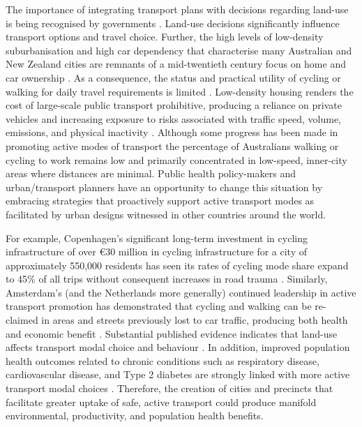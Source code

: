 \documentclass[final,3p,times,authoryear]{elsarticle}
\begin{document}
The importance of integrating transport plans with decisions regarding land-use is being recognised by governments \citep{ATAP2016,SA2015}. Land-use decisions significantly influence transport options and travel choice. Further, the high levels of low-density suburbanisation and high car dependency that characterise many Australian and New Zealand cities are remnants of a mid-twentieth century focus on home and car ownership \citep{Currie2007,Dodson2008}. As a consequence, the status and practical utility of cycling or walking for daily travel requirements is limited \citep{Heesch2014,Daley2011}. Low-density housing renders the cost of large-scale public transport prohibitive, producing a reliance on private vehicles and increasing exposure to risks associated with traffic speed, volume, emissions, and physical inactivity  \citep{Cepeda2016,MingWen2008,Norman2006}. Although some progress has been made in promoting active modes of transport the percentage of Australians walking or cycling to work remains low and primarily concentrated in low-speed, inner-city areas where distances are minimal. Public health policy-makers and urban/transport planners have an opportunity to change this situation by embracing strategies that proactively support active transport modes as facilitated by urban designs witnessed in other countries around the world.

For example, Copenhagen's significant long-term investment in cycling infrastructure of over \euro 30 million in cycling infrastructure for a city of approximately 550,000 residents has seen its rates of cycling mode share expand to 45\% of all trips without consequent increases in road trauma \citep{Kaplan2014}. Similarly, Amsterdam's (and the Netherlands more generally) continued leadership in active transport promotion has demonstrated that cycling and walking can be re-claimed in areas and streets previously lost to car traffic, producing both health and economic benefit \citep{Andersen2000}. Substantial published evidence indicates that land-use affects transport modal choice and behaviour  \citep{Giles-corti2016,Kleinert2016,Goenka2016}. In addition, improved population health outcomes related to chronic conditions such as respiratory disease, cardiovascular disease, and Type 2 diabetes are strongly linked with more active transport modal choices  \citep{Zapata-Diomedi2017}. Therefore, the creation of cities and precincts that facilitate greater uptake of safe, active transport could produce manifold environmental, productivity, and population health benefits. 
\end{document}
